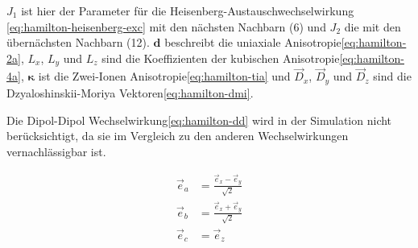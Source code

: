 \documentclass[main.tex]{subfiles}
\begin{document}
\(J_1\) ist hier der Parameter für die Heisenberg-Austauschwechselwirkung
\eqref{eq:hamilton-heisenberg-exc} mit den nächsten Nachbarn (6) und \(J_2\)
die mit den übernächsten Nachbarn (12). \(\bm{d}\)
beschreibt die uniaxiale Anisotropie\eqref{eq:hamilton-2a}, \(L_x\), \(L_y\)
und \(L_z\) sind die Koeffizienten der kubischen
Anisotropie\eqref{eq:hamilton-4a}, \(\bm{\kappa}\) ist die Zwei-Ionen
Anisotropie\eqref{eq:hamilton-tia} und \(\vec{D}_x\), \(\vec{D}_y\) und
\(\vec{D}_z\) sind die Dzyaloshinskii-Moriya Vektoren\eqref{eq:hamilton-dmi}.

Die Dipol-Dipol Wechselwirkung\eqref{eq:hamilton-dd} wird in der Simulation
nicht berücksichtigt, da sie im Vergleich zu den anderen Wechselwirkungen
vernachlässigbar ist.


\begin{align}
	\vec{e}_a &= \frac{\vec{e}_x - \vec{e}_y}{\sqrt{2}} \\
	\vec{e}_b &= \frac{\vec{e}_x + \vec{e}_y}{\sqrt{2}} \\
	\vec{e}_c &= \vec{e}_z
\end{align}
\end{document}
